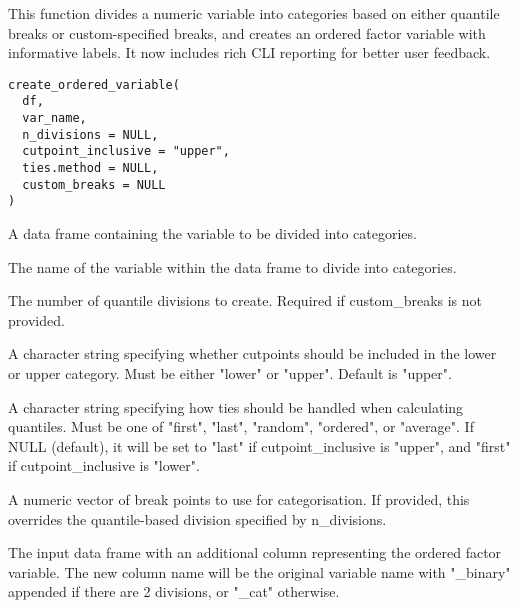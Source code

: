 \documentclass[a4paper]{book}
\begin{document}
%
\begin{Description}
This function divides a numeric variable into categories based on either quantile breaks
or custom-specified breaks, and creates an ordered factor variable with informative labels.
It now includes rich CLI reporting for better user feedback.
\end{Description}
%
\begin{Usage}
\begin{verbatim}
create_ordered_variable(
  df,
  var_name,
  n_divisions = NULL,
  cutpoint_inclusive = "upper",
  ties.method = NULL,
  custom_breaks = NULL
)
\end{verbatim}
\end{Usage}
%
\begin{Arguments}
\begin{ldescription}
\item[\code{df}] A data frame containing the variable to be divided into categories.

\item[\code{var\_name}] The name of the variable within the data frame to divide into categories.

\item[\code{n\_divisions}] The number of quantile divisions to create. Required if custom\_breaks is not provided.

\item[\code{cutpoint\_inclusive}] A character string specifying whether cutpoints should be included
in the lower or upper category. Must be either "lower" or "upper". Default is "upper".

\item[\code{ties.method}] A character string specifying how ties should be handled when calculating quantiles.
Must be one of "first", "last", "random", "ordered", or "average".
If NULL (default), it will be set to "last" if cutpoint\_inclusive is "upper",
and "first" if cutpoint\_inclusive is "lower".

\item[\code{custom\_breaks}] A numeric vector of break points to use for categorisation. If provided,
this overrides the quantile-based division specified by n\_divisions.
\end{ldescription}
\end{Arguments}
%
\begin{Value}
The input data frame with an additional column representing the ordered factor variable.
The new column name will be the original variable name with "\_binary" appended if there
are 2 divisions, or "\_cat" otherwise.
\end{Value}
\end{document}
